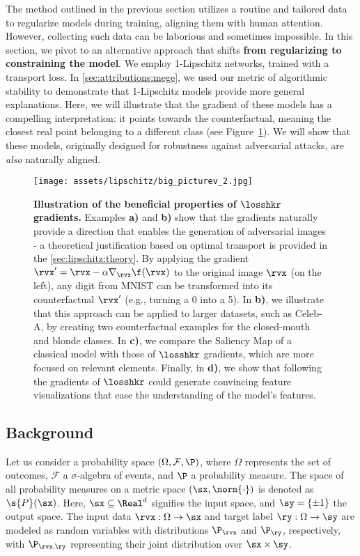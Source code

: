 The method outlined in the previous section utilizes a routine and tailored data to regularize models during training, aligning them with human attention. However, collecting such data can be laborious and sometimes impossible. In this section, we pivot to an alternative approach that shifts \textbf{from regularizing to constraining the model}. We employ 1-Lipschitz networks, trained with a transport loss. In \autoref{sec:attributions:mege}, we used our metric of algorithmic stability to demonstrate that 1-Lipschitz models provide more general explanations. Here, we will illustrate that the gradient of these models has a compelling interpretation: it points towards the counterfactual, meaning the closest real point belonging to a different class (see Figure~\ref{fig:lipschitz:big_picture}). We will show that these models, originally designed for robustness against adversarial attacks, are \textit{also} naturally aligned.

\begin{figure*}[ht]
  \centering
  \texttt{[image: assets/lipschitz/big\_picturev\_2.jpg]}
\caption{
\textbf{Illustration of the beneficial properties of $\losshkr$ gradients.} Examples \textbf{a)} and \textbf{b)} show that the gradients naturally provide a direction that enables the generation of adversarial images - a theoretical justification based on optimal transport is provided in the \autoref{sec:lipschitz:theory}. By applying the gradient $\rvx' = \rvx  -\alpha \nabla_{\rvx}  \f(\rvx)$ to the original image $\rvx$ (on the left), any digit from MNIST can be transformed into its counterfactual $\rvx'$ (e.g., turning a 0 into a 5). 
In \textbf{b)}, we illustrate that this approach can be applied to larger datasets, such as Celeb-A, by creating two counterfactual examples for the closed-mouth and blonde  classes. In \textbf{c)}, we compare the Saliency Map of a classical model with those of $\losshkr$ gradients, which are more focused on relevant elements. Finally, in \textbf{d)}, we show that following the gradients of $\losshkr$ could generate convincing feature visualizations that ease the understanding of the model's features. 
}
\label{fig:lipschitz:big_picture}
\end{figure*}

\subsection{Background}

Let us consider a probability space $(\Omega, \mathcal{F}, \P)$, where $\Omega$ represents the set of outcomes, $\mathcal{F}$ a $\sigma$-algebra of events, and $\P$ a probability measure. The space of all probability measures on a metric space $(\sx, \norm{\cdot})$ is denoted as $\s{P}(\sx)$. Here, $\sx \subseteq \Real^d$ signifies the input space, and $\sy = \{\pm 1\}$ the output space. The input data $\rvx : \Omega \rightarrow \sx$ and target label $\ry : \Omega \rightarrow \sy$ are modeled as random variables with distributions $\P_{\rvx}$ and $\P_{\ry}$, respectively, with $\P_{\rvx,\ry}$ representing their joint distribution over $\sx \times \sy$.

